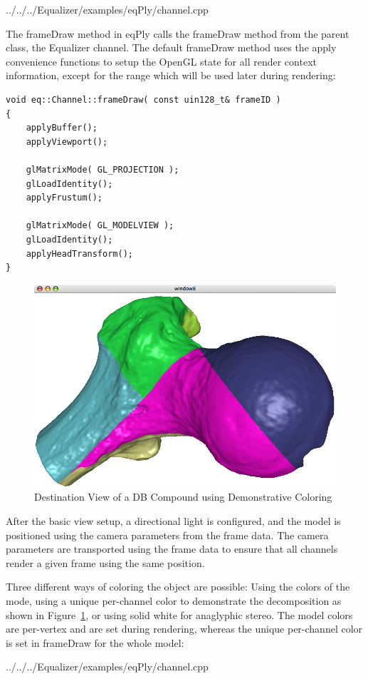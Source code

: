 \documentclass[10pt,a4]{scrartcl}
\newcommand{\fig}[1]{Figure~\ref{#1}}
\begin{document}
{\footnotesize
  {../../../Equalizer/examples/eqPly/channel.cpp}}

The \textsf{frameDraw} method in \textsf{eqPly} calls the \textsf{frameDraw}
method from the parent class, the Equalizer channel. The default
\textsf{frameDraw} method uses the apply convenience functions to setup the
OpenGL state for all render context information, except for the range which will
be used later during rendering:

{\footnotesize\begin{lstlisting}
void eq::Channel::frameDraw( const uin128_t& frameID )
{
    applyBuffer();
    applyViewport();
    
    glMatrixMode( GL_PROJECTION );
    glLoadIdentity();
    applyFrustum();

    glMatrixMode( GL_MODELVIEW );
    glLoadIdentity();
    applyHeadTransform();
}
\end{lstlisting}}

\begin{figure}
  \vspace{-2ex}\includegraphics[width=.382\textwidth]{images/DB.png}
  {\caption{\label{fDBDest}Destination View of a DB Compound using
      Demonstrative Coloring}}
\end{figure}
After the basic view setup, a directional light is configured, and the
model is positioned using the camera parameters from the frame data. The
camera parameters are transported using the frame data to ensure
that all channels render a given frame using the same position.

Three different ways of coloring the object are possible: Using the
colors of the mode, using a unique per-channel color to demonstrate the
decomposition as shown in \fig{fDBDest}, or using solid white for
anaglyphic stereo. The model colors are per-vertex and are set during
rendering, whereas the unique per-channel color is set in
\textsf{frameDraw} for the whole model:

{\footnotesize
  {../../../Equalizer/examples/eqPly/channel.cpp}}
\end{document}
